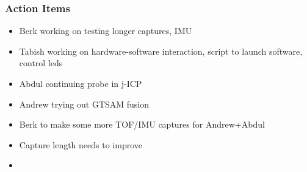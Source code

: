 		\subsubsection*{Action Items}
			\begin{itemize}
				\item Berk working on testing longer captures, IMU
				\item Tabish working on hardware-software interaction, script to launch software, control leds
				\item Abdul continuing probe in j-ICP
				\item Andrew trying out GTSAM fusion
				\item Berk to make some more TOF/IMU captures for Andrew+Abdul
				\item Capture length needs to improve 
				\item 
			\end{itemize}

